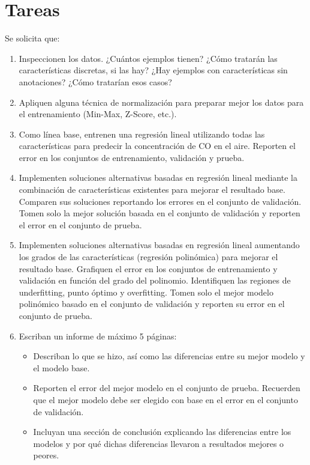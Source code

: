 \section{Tareas}

Se solicita que:

\begin{enumerate}
    \item Inspeccionen los datos. ¿Cuántos ejemplos tienen? ¿Cómo tratarán las características discretas, si las hay? ¿Hay ejemplos con características sin anotaciones? ¿Cómo tratarían esos casos?
    \item Apliquen alguna técnica de normalización para preparar mejor los datos para el entrenamiento (Min-Max, Z-Score, etc.).
    \item Como línea base, entrenen una regresión lineal utilizando todas las características para predecir la concentración de CO en el aire. Reporten el error en los conjuntos de entrenamiento, validación y prueba.
    \item Implementen soluciones alternativas basadas en regresión lineal mediante la combinación de características existentes para mejorar el resultado base. Comparen sus soluciones reportando los errores en el conjunto de validación. Tomen solo la mejor solución basada en el conjunto de validación y reporten el error en el conjunto de prueba.
    \item Implementen soluciones alternativas basadas en regresión lineal aumentando los grados de las características (regresión polinómica) para mejorar el resultado base. Grafiquen el error en los conjuntos de entrenamiento y validación en función del grado del polinomio. Identifiquen las regiones de underfitting, punto óptimo y overfitting. Tomen solo el mejor modelo polinómico basado en el conjunto de validación y reporten su error en el conjunto de prueba.
    \item Escriban un informe de máximo 5 páginas:
    \begin{itemize}
        \item Describan lo que se hizo, así como las diferencias entre su mejor modelo y el modelo base.
        \item Reporten el error del mejor modelo en el conjunto de prueba. Recuerden que el mejor modelo debe ser elegido con base en el error en el conjunto de validación.
        \item Incluyan una sección de conclusión explicando las diferencias entre los modelos y por qué dichas diferencias llevaron a resultados mejores o peores.
    \end{itemize}
\end{enumerate}

